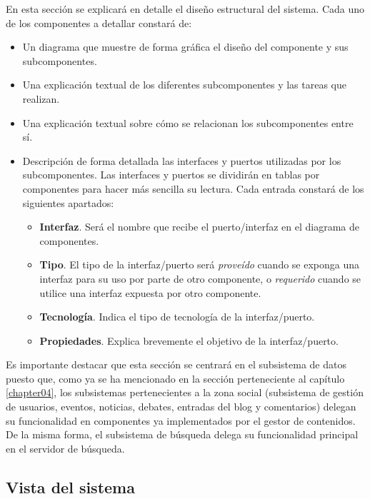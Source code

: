En esta sección se explicará en detalle el diseño estructural del sistema.  Cada uno de los componentes a detallar constará de:
\begin{itemize}
	\item Un diagrama que muestre de forma gráfica el diseño del componente y sus subcomponentes.
	\item Una explicación textual de los diferentes subcomponentes y las tareas que realizan.
	\item Una explicación textual sobre cómo se relacionan los subcomponentes entre sí.
	\item Descripción de forma detallada las interfaces y puertos utilizadas por los subcomponentes.  Las interfaces y puertos se dividirán en tablas por componentes para hacer más sencilla su lectura.	Cada entrada constará de los siguientes apartados:
	\begin{itemize}
		\item \textbf{Interfaz}.  Será el nombre que recibe el puerto/interfaz en el diagrama de componentes.
		\item \textbf{Tipo}.  El tipo de la interfaz/puerto será \textit{proveído} cuando se exponga una interfaz para su uso por parte de otro componente, o \textit{requerido} cuando se utilice una interfaz expuesta por otro componente.
		\item \textbf{Tecnología}.  Indica el tipo de tecnología de la interfaz/puerto.
		\item \textbf{Propiedades}.  Explica brevemente el objetivo de la interfaz/puerto.
	\end{itemize}
\end{itemize}

Es importante destacar que esta sección se centrará en el subsistema de datos puesto que, como ya se ha mencionado en la sección  perteneciente al capítulo \ref{chapter04}, los subsistemas pertenecientes a la zona social (subsistema de gestión de usuarios, eventos, noticias, debates, entradas del blog y comentarios) delegan su funcionalidad en componentes ya implementados por el gestor de contenidos.  De la misma forma, el subsistema de búsqueda delega su funcionalidad principal en el servidor de búsqueda.

\subsection{Vista del sistema}
\label{vista_sistema}



